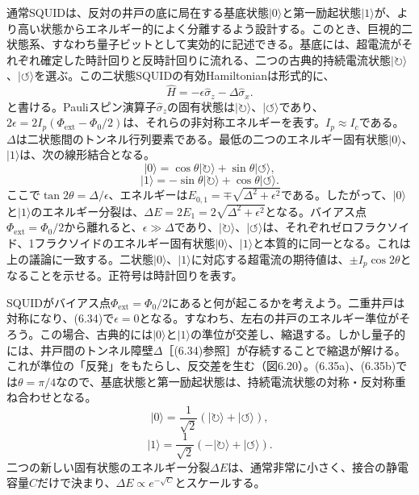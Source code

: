 通常SQUIDは、反対の井戸の底に局在する基底状態$|0\rangle$と第一励起状態$|1\rangle$が、より高い状態からエネルギー的によく分離するよう設計する。このとき、巨視的二状態系、すなわち量子ビットとして実効的に記述できる。基底には、超電流がそれぞれ確定した時計回りと反時計回りに流れる、二つの古典的持続電流状態$|\circlearrowright\rangle$、$|\circlearrowleft\rangle$を選ぶ。この二状態SQUIDの有効Hamiltonianは形式的に、
\begin{equation}\hat H=-\epsilon\hat\sigma_z-\Delta\hat\sigma_x.\tag{6.34}\end{equation}
\hypertarget{srcpage:275}{}\label{srcpage:275}
と書ける。Pauliスピン演算子$\hat\sigma_z$の固有状態は$|\circlearrowright\rangle$、$|\circlearrowleft\rangle$であり、$2\epsilon=2I_p(\Phi_{\mathrm{ext}}-\Phi_0/2)$は、それらの非対称エネルギーを表す。$I_p\approx I_c$である。$\Delta$は二状態間のトンネル行列要素である。最低の二つのエネルギー固有状態$|0\rangle$、$|1\rangle$は、次の線形結合となる。
\begin{equation}|0\rangle=\cos\theta|\circlearrowright\rangle+\sin\theta|\circlearrowleft\rangle,\tag{6.35a}\end{equation}
\begin{equation}|1\rangle=-\sin\theta|\circlearrowright\rangle+\cos\theta|\circlearrowleft\rangle.\tag{6.35b}\end{equation}
ここで$\tan2\theta=\Delta/\epsilon$、エネルギーは$E_{0,1}=\mp\sqrt{\Delta^2+\epsilon^2}$である。したがって、$|0\rangle$と$|1\rangle$のエネルギー分裂は、$\Delta E=2E_1=2\sqrt{\Delta^2+\epsilon^2}$となる。バイアス点$\Phi_{\mathrm{ext}}=\Phi_0/2$から離れると、$\epsilon\gg\Delta$であり、$|\circlearrowright\rangle$、$|\circlearrowleft\rangle$は、それぞれゼロフラクソイド、1フラクソイドのエネルギー固有状態$|0\rangle$、$|1\rangle$と本質的に同一となる。これは上の議論に一致する。二状態$|0\rangle$、$|1\rangle$に対応する超電流の期待値は、$\pm I_p\cos2\theta$となることを示せる。正符号は時計回りを表す。

SQUIDがバイアス点$\Phi_{\mathrm{ext}}=\Phi_0/2$にあると何が起こるかを考えよう。二重井戸は対称になり、(6.34)で$\epsilon=0$となる。すなわち、左右の井戸のエネルギー準位がそろう。この場合、古典的には$|0\rangle$と$|1\rangle$の準位が交差し、縮退する。しかし量子的には、井戸間のトンネル障壁$\Delta$［(6.34)参照］が存続することで縮退が解ける。これが準位の「反発」をもたらし、反交差を生む（図6.20）。(6.35a)、(6.35b)では$\theta=\pi/4$なので、基底状態と第一励起状態は、持続電流状態の対称・反対称重ね合わせとなる。
\begin{equation}|0\rangle=\frac1{\sqrt2}(|\circlearrowright\rangle+|\circlearrowleft\rangle),\tag{6.36a}\end{equation}
\begin{equation}|1\rangle=\frac1{\sqrt2}(-|\circlearrowright\rangle+|\circlearrowleft\rangle).\tag{6.36b}\end{equation}
二つの新しい固有状態のエネルギー分裂$\Delta E$は、通常非常に小さく、接合の静電容量$C$だけで決まり、$\Delta E\propto e^{-\sqrt C}$とスケールする。


